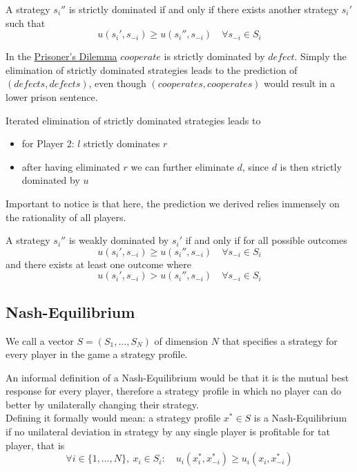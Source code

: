 \begin{definition} 
	A strategy $s_{i}''$ is strictly dominated if and only if there exists another strategy $s_{i}'$ such that
	\[ u(s_{i}', s_{-i}) \geq u(s_{i}'', s_{-i}) \quad \forall s_{-i} \in S_{i} \]	
\end{definition}

In the \hyperref[prisonersdilemma]{Prisoner's Dilemma} $cooperate$ is strictly dominated by $defect$. Simply the elimination of strictly dominated strategies leads to the prediction of $(defects, defects)$, even though $(cooperates, cooperates)$ would result in a lower prison sentence.


\begin{example}
	Iterated elimination of strictly dominated strategies leads to
	\begin{itemize}
		\item for Player 2: $l$ strictly dominates $r$
		\item after having eliminated $r$ we can further eliminate $d$, since $d$ is then strictly dominated by $u$
	\end{itemize}
\end{example}

Important to notice is that here, the prediction we derived relies immensely on the rationality of all players.

\begin{definition} 
	A strategy $s_{i}''$ is weakly dominated by $s_{i}'$ if and only if for all possible outcomes 
	\[ u(s_{i}', s_{-i}) \geq u(s_{i}'', s_{-i}) \quad \forall s_{-i} \in S_{i} \]	
	and there exists at least one outcome where
		\[ u(s_{i}', s_{-i}) > u(s_{i}'', s_{-i}) \quad \forall s_{-i} \in S_{i} \]	 
\end{definition}

\subsection{Nash-Equilibrium}

\begin{definition} \label{strategyprofile} 
	We call a vector $S = (S_{1}, \dotsc, S_{N})$ of dimension $N$ that specifies a strategy for every player in the game a strategy profile.
\end{definition}

\begin{definition} \label{nashequilibrium} 
	An informal definition of a Nash-Equilibrium would be that it is the mutual best response for every player, therefore a strategy profile in which no player can do better by unilaterally changing their strategy. \\
	Defining it formally would mean: a strategy profile $x^{*} \in S$ is a Nash-Equilibrium if no unilateral deviation in strategy by any single player is profitable for tat player, that is
	\[ \forall i \in \{1, \dotsc, N \},~ x_{i} \in S_{i} : \quad u_{i}(x_{i}^{*}, x_{-i}^{*}) \geq u_{i}(x_{i}, x_{-i}^{*}) \]
	\end{definition}

